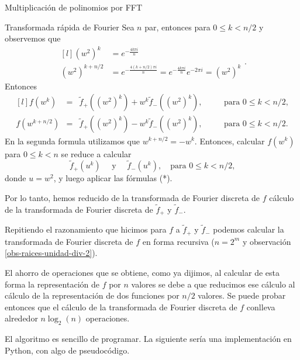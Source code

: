 \begin{chapter}{Multiplicación de polinomios por FFT}
\begin{section}{Transformada rápida de Fourier}
  Sea $n$ par, entonces para $0 \le k <n/2$ y observemos que
  \begin{equation*}
      \begin{matrix*}[l]
          (w^2)^k &= e^{-\frac{4k\pi i}{n}}   \\
          (w^2)^{k+ n/2} &= e^{-\frac{4(k+n/2)\pi i}{n}}= e^{-\frac{4k\pi i}{n}}e^{-2\pi i}= (w^2)^k
      \end{matrix*}.
  \end{equation*}
  Entonces
  \begin{equation*}
      \begin{matrix*}[l]
          f(w^k) &=& \tilde{f}_+((w^2)^k) + w^k \tilde{f}_-((w^2)^k),& \quad &\text{para $0 \le k < n/2$,} \\
          f(w^{k+n/2}) &=& \tilde{f}_+((w^2)^k) - w^{k} \tilde{f}_-((w^2)^k),& \quad &\text{para $0 \le k < n/2$.}
      \end{matrix*} \tag{*}
  \end{equation*}
  En la segunda formula utilizamos que $w^{k + n/2}= -w^k$. Entonces, calcular $f(w^k)$ para $0 \le k < n$ se reduce a calcular
  $$
      \tilde{f}_+(u^k) \quad\text{ y }\quad  \tilde{f}_-(u^k), \quad \text{para $0 \le k < n/2$,}
  $$
  donde $u= w^2$, y  luego  aplicar las fórmulas (*).

  Por lo tanto, hemos reducido de la transformada de Fourier discreta de $f$  cálculo de la transformada de Fourier discreta de $\tilde{f}_+$ y $\tilde{f}_-$.

  Repitiendo el razonamiento  que hicimos para $f$  a  $\tilde{f}_+$ y $\tilde{f}_-$ podemos calcular la transformada de Fourier discreta de $f$ en forma recursiva ($n = 2^m$ y observación \ref{obs-raices-unidad-div-2}).

  El ahorro de operaciones que se obtiene, como ya dijimos, al calcular de esta forma la representación de $f$ por $n$ valores se debe a que reducimos ese cálculo al cálculo de la representación de  dos funciones por $n/2$ valores. Se puede probar entonces que el cálculo de la transformada de Fourier discreta de $f$ conlleva alrededor $n\log_2(n)$ operaciones.

  El algoritmo es sencillo de programar. La siguiente sería una implementación en Python,  con algo de pseudocódigo.


\end{section}
\end{chapter}
